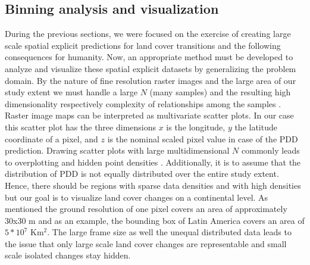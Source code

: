 	\subsection{Binning analysis and visualization}
		During the previous sections, we were focused on the exercise of creating large scale spatial explicit predictions for land cover transitions and the following consequences for humanity. Now, an appropriate method must be developed to analyze and visualize these spatial explicit datasets by generalizing the problem domain. By the nature of fine resolution raster images and the large area of our study extent we must handle a large $N$ (many samples) and the resulting high dimensionality respectively complexity of relationships among the samples \citep{Carr1990}. Raster image maps can be interpreted as multivariate scatter plots. In our case this scatter plot has the three dimensions $x$ is the longitude, $y$ the latitude coordinate of a pixel, and $z$ is the nominal scaled pixel value in case of the \ac{PDD} prediction. Drawing scatter plots with large multidimensional $N$ commonly leads to overplotting and hidden point densities \citep{Carr1987}. Additionally, it is to assume that the distribution of \ac{PDD} is not equally distributed over the entire study extent. Hence, there should be regions with sparse data densities and with high densities but our goal is to visualize land cover changes on a continental level. As mentioned the ground resolution of one pixel covers an area of approximately 30x30 m and as an example, the bounding box of Latin America covers an area of $5*10^7$ Km$^2$. The large frame size as well the unequal distributed data leads to the issue that only large scale land cover changes are representable and small scale isolated changes stay hidden.

